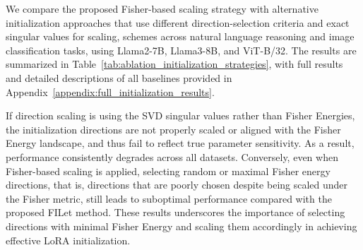 \documentclass{article}
\theoremstyle{plain}
\theoremstyle{definition}
\theoremstyle{remark}
\begin{document}
\begin{table}[ht]
  \renewcommand\arraystretch{1.1}
  \centering
  \caption{Experimental results of different initialization strategies. FILet-SVD-P, FILet-SVD-R, and FILet-SVD-M denote variants that select directions with maximal, random, and minimal Fisher Energy, respectively, and scale them using the corresponding singular values. FILet-P, FILet-R, and FILet-M denote the corresponding variants that use Fisher-based scaling. All experiments are conducted with BF16 precision, and results are reported as the median over five runs. The best-performing result for each dataset is highlighted in \textbf{bold}.}

  \label{tab:ablation_initialization_strategies}
  
\end{table}

We compare the proposed Fisher-based scaling strategy with alternative initialization approaches that use different direction-selection criteria and exact singular values for scaling, schemes across natural language reasoning and image classification tasks, using Llama2-7B, Llama3-8B, and ViT-B/32. The results are summarized in Table~\ref{tab:ablation_initialization_strategies}, with full results and detailed descriptions of all baselines provided in Appendix~\ref{appendix:full_initialization_results}. 

If direction scaling is using the SVD singular values rather than Fisher Energies, the initialization directions are not properly scaled or aligned with the Fisher Energy landscape, and thus fail to reflect true parameter sensitivity. As a result, performance consistently degrades across all datasets. Conversely, even when Fisher-based scaling is applied, selecting random or maximal Fisher energy directions, that is, directions that are poorly chosen despite being scaled under the Fisher metric, still leads to suboptimal performance compared with the proposed FILet method. These results underscores the importance of selecting directions with minimal Fisher Energy and scaling them accordingly in achieving effective LoRA initialization.
\end{document}

